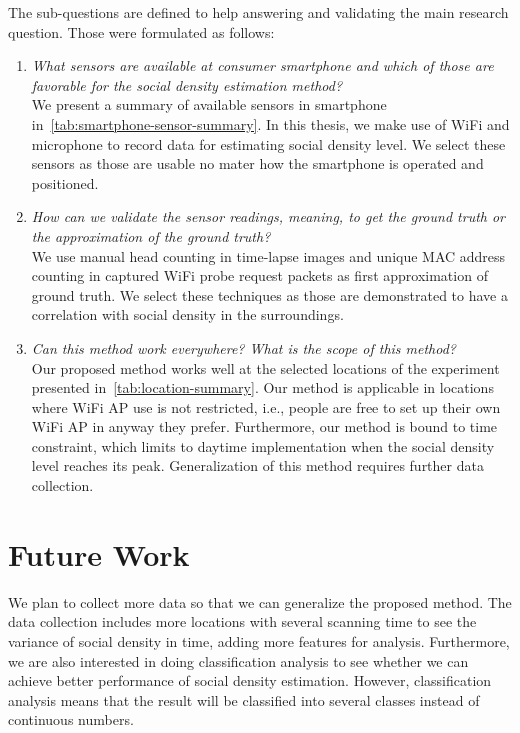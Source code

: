 The sub-questions are defined to help answering and validating the main research question. Those were formulated as follows:
\begin{enumerate}
	\item \textit{What sensors are available at consumer smartphone and which of those are favorable for the social density estimation method?}\\
	We present a summary of available sensors in smartphone in~\autoref{tab:smartphone-sensor-summary}. In this thesis, we make use of WiFi and microphone to record data for estimating social density level. We select these sensors as those are usable no mater how the smartphone is operated and positioned.

	\item \textit{How can we validate the sensor readings, meaning, to get the ground truth or the approximation of the ground truth?}\\
	We use manual head counting in time-lapse images and unique \ac{MAC} address counting in captured WiFi probe request packets as first approximation of ground truth. We select these techniques as those are demonstrated to have a correlation with social density in the surroundings.


	\item \textit{Can this method work everywhere? What is the scope of this method?}\\
	Our proposed method works well at the selected locations of the experiment presented in~\autoref{tab:location-summary}. Our method is applicable in locations where WiFi \ac{AP} use is not restricted, i.e., people are free to set up their own WiFi \ac{AP} in anyway they prefer. Furthermore, our method is bound to time constraint, which limits to daytime implementation when the social density level reaches its peak. Generalization of this method requires further data collection.
\end{enumerate}

\section{Future Work} %
\label{sec:future_work}
We plan to collect more data so that we can generalize the proposed method. The data collection includes more locations with several scanning time to see the variance of social density in time, adding more features for analysis. Furthermore, we are also interested in doing classification analysis to see whether we can achieve better performance of social density estimation. However, classification analysis means that the result will be classified into several classes instead of continuous numbers.

